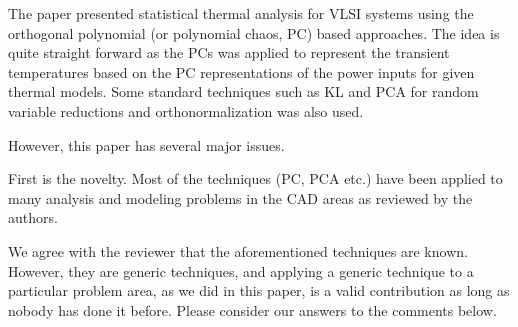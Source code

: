 \begin{reviewer}
The paper presented statistical thermal analysis for VLSI systems using the orthogonal polynomial  (or polynomial chaos, PC) based approaches. The idea is quite straight forward as the PCs was applied to represent the transient temperatures based on the PC representations of the power inputs for given thermal models. Some standard techniques such as KL and PCA for random variable reductions and orthonormalization was also used.

However, this paper has several major issues.

First is the novelty. Most of the techniques (PC, PCA etc.) have been applied to many analysis and modeling problems in the CAD areas as reviewed by the authors.
\end{reviewer}
\begin{authors}
We agree with the reviewer that the aforementioned techniques are known.
However, they are generic techniques, and applying a generic technique to a particular problem area, as we did in this paper, is a valid contribution as long as nobody has done it before.
Please consider our answers to the comments below.
\end{authors}

